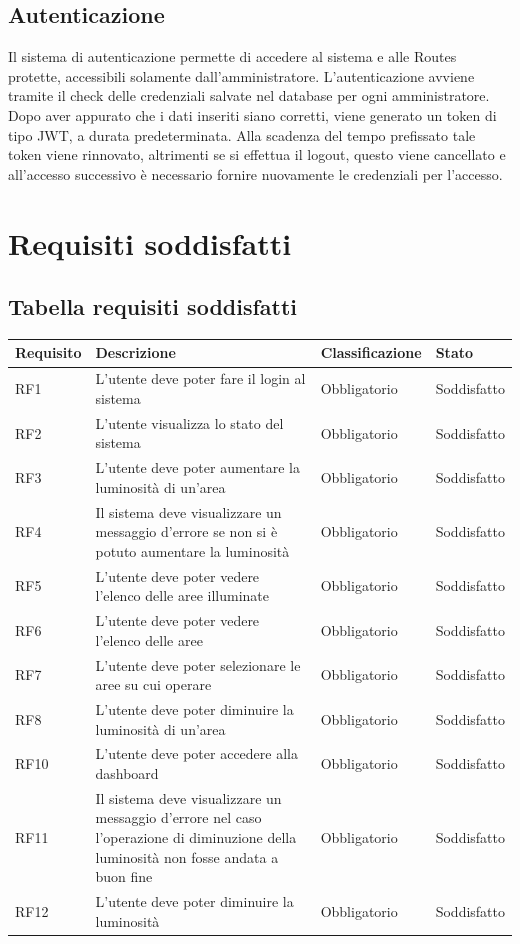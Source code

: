 \documentclass[12pt]{article}
\begin{document}
\subsection{Autenticazione}
Il sistema di autenticazione permette di accedere al sistema e alle Routes protette, accessibili solamente dall'amministratore.
L'autenticazione avviene tramite il check delle credenziali salvate nel database per ogni amministratore.
Dopo aver appurato che i dati inseriti siano corretti, viene generato un token di tipo JWT, a durata predeterminata. Alla scadenza del tempo prefissato tale token viene rinnovato, altrimenti se si effettua il logout, questo viene cancellato e all'accesso successivo è necessario fornire nuovamente le credenziali per l'accesso.

 	
\section{Requisiti soddisfatti}
\subsection{Tabella requisiti soddisfatti}

\begin{tabular}{ |p{1.8cm}|p{5.2cm}|p{2.5cm}| p{3.5cm}| }
	\hline
	Requisito& Descrizione &Classificazione & Stato \\
	\hline
	RF1	 & L'utente deve poter fare il login al sistema & Obbligatorio & Soddisfatto \\
	\hline				
	RF2	 & L'utente visualizza lo stato del sistema & Obbligatorio & Soddisfatto \\
	\hline				
	RF3	 & L'utente deve poter aumentare la luminosità di un'area & Obbligatorio & Soddisfatto \\
	\hline				
	RF4	 & Il sistema deve visualizzare un messaggio d'errore se non si è potuto aumentare la luminosità & Obbligatorio & Soddisfatto \\
	\hline	
	RF5 & L'utente deve poter vedere l'elenco delle aree illuminate & Obbligatorio & Soddisfatto \\
	\hline
	RF6 & L'utente deve poter vedere l'elenco delle aree & Obbligatorio & Soddisfatto \\
	\hline
	RF7	 & L'utente deve poter selezionare le aree su cui operare & Obbligatorio & Soddisfatto \\
	\hline	
	RF8	 & L'utente deve poter diminuire la luminosità di un'area & Obbligatorio & Soddisfatto \\
	\hline				
	RF10	 & L'utente deve poter accedere alla dashboard & Obbligatorio & Soddisfatto \\
	\hline										
	RF11	 & Il sistema deve visualizzare un messaggio d'errore nel caso l'operazione di diminuzione della luminosità non fosse andata a buon fine & Obbligatorio & Soddisfatto \\
	\hline				
	RF12	 & L'utente deve poter diminuire la luminosità & Obbligatorio & Soddisfatto \\
	\hline				
\end{tabular}
\end{document}
